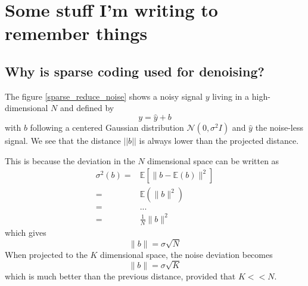 
\clearpage
{}
\appendix

\chapter{Some stuff I'm writing to remember things}

\section{Why is sparse coding used for denoising?}

The figure \ref{sparse_reduce_noise} shows a noisy signal $y$ living in a high-dimensional $N$ and defined by
$$y=\hat{y} + b$$
with $b$ following a centered Gaussian distribution $\mathcal{N}(0,\sigma^2I)$ and $\hat{y}$ the noise-less signal. We see that the distance $||b||$ is always lower than the projected distance.

This is because the deviation in the $N$ dimensional space can be written as
\begin{align*}
\sigma^2(b) =& \mathbb{E}\left[\lVert b-\mathbb{E}(b) \rVert^2 \right]\\
=& \mathbb{E}\left(\lVert b \rVert^2 \right)\\
=& ... \\ %
=& \frac{1}{N}\lVert b \rVert^2
\end{align*}
which gives 
$$ \lVert b \rVert = \sigma\sqrt{N} $$
When projected to the $K$ dimensional space, the noise deviation becomes
$$\lVert b \rVert = \sigma\sqrt{K} $$
which is much better than the previous distance, provided that $K<<N$. 

